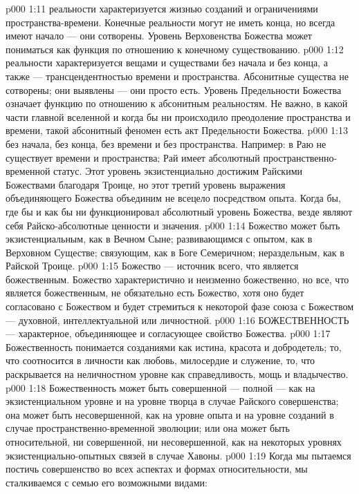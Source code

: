 \vs p000 1:11 \pc {} реальности характеризуется жизнью созданий и ограничениями пространства\hyp{}времени. Конечные реальности могут не иметь конца, но всегда имеют начало --- они сотворены. Уровень Верховенства Божества может пониматься как функция по отношению к конечному существованию.
\vs p000 1:12 \pc {} реальности характеризуется вещами и существами без начала и без конца, а также --- трансцендентностью времени и пространства. Абсонитные существа не сотворены; они выявлены --- они просто есть. Уровень Предельности Божества означает функцию по отношению к абсонитным реальностям. Не важно, в какой части главной вселенной и когда бы ни происходило преодоление пространства и времени, такой абсонитный феномен есть акт Предельности Божества.
\vs p000 1:13 \pc {} без начала, без конца, без времени и без пространства. Например: в Раю не существует времени и пространства; Рай имеет абсолютный пространственно\hyp{}временной статус. Этот уровень экзистенциально достижим Райскими Божествами благодаря Троице, но этот третий уровень выражения объединяющего Божества объединим не всецело посредством опыта. Когда бы, где бы и как бы ни функционировал абсолютный уровень Божества, везде являют себя Райско\hyp{}абсолютные ценности и значения.
\vs p000 1:14 \pc Божество может быть экзистенциальным, как в Вечном Сыне; развивающимся с опытом, как в Верховном Существе; связующим, как в Боге Семеричном; нераздельным, как в Райской Троице.
\vs p000 1:15 Божество --- источник всего, что является божественным. Божество характеристично и неизменно божественно, но все, что является божественным, не обязательно есть Божество, хотя оно будет согласовано с Божеством и будет стремиться к некоторой фазе союза с Божеством --- духовной, интеллектуальной или личностной.
\vs p000 1:16 \pc БОЖЕСТВЕННОСТЬ --- характерное, объединяющее и согласующее свойство Божества.
\vs p000 1:17 Божественность понимается созданиями как истина, красота и добродетель; то, что соотносится в личности как любовь, милосердие и служение, то, что раскрывается на неличностном уровне как справедливость, мощь и владычество.
\vs p000 1:18 Божественность может быть совершенной --- полной --- как на экзистенциальном уровне и на уровне творца в случае Райского совершенства; она может быть несовершенной, как на уровне опыта и на уровне созданий в случае пространственно\hyp{}временной эволюции; или она может быть относительной, ни совершенной, ни несовершенной, как на некоторых уровнях экзистенциально\hyp{}опытных связей в случае Хавоны.
\vs p000 1:19 \pc Когда мы пытаемся постичь совершенство во всех аспектах и формах относительности, мы сталкиваемся с семью его возможными видами:
